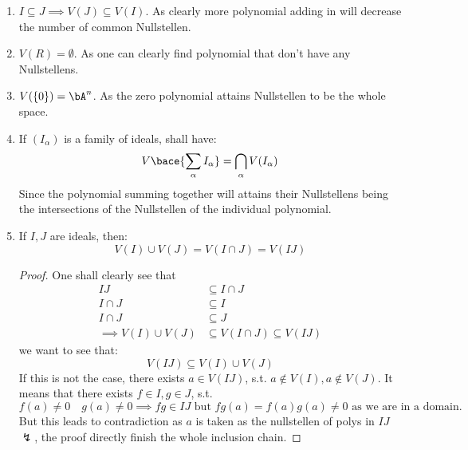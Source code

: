 \begin{remark}
	\leavevmode
	\begin{enumerate}
		\item \( I \subseteq J \implies V(J) \subseteq V(I) \). As clearly more polynomial adding in
		      will decrease the number of common Nullstellen.
		\item \( V(R) = \emptyset \). As one can clearly find polynomial that don't have any
		      Nullstellens.
		\item \( V(\{0\}) = \bA^n \). As the zero polynomial attains Nullstellen to be the whole space.
		\item If \( (I_\alpha) \) is a family of ideals, shall have:
		      \[
			      V\bace{\sum_{\alpha} I_\alpha} = \bigcap_\alpha V(I_\alpha)
		      \]
		      Since the polynomial summing together will attains their Nullstellens being the
		      intersections of the Nullstellen of the individual polynomial.
		\item If \( I, J \) are ideals, then:
		      \[
			      V(I) \cup V(J) = V(I \cap J) = V(IJ)
		      \]
		      \begin{proof}
			      One shall clearly see that
			      $$
				      \begin{aligned}
					      IJ                      & \subseteq I\cap J                     \\
					      I \cap J                & \subseteq I                           \\
					      I \cap J                & \subseteq J                           \\
					      \implies V(I) \cup V(J) & \subseteq V(I \cap J) \subseteq V(IJ)
				      \end{aligned}
			      $$
			      we want to see that:
			      \[
				      V(IJ) \subseteq V(I) \cup V(J)
			      \]
			      If this is not the case, there exists \( a\in V(IJ) \), s.t. \( a\not\in V(I), a\not\in
			      V(J)\). It means that there exists \( f \in I, g\in J \), s.t.
			      \[
				      f(a) \ne 0 \quad g(a) \ne 0 \implies fg \in IJ \text{ but } fg(a) = f(a) g(a) \ne 0
				      \text{ as we are in a domain.}
			      \]
			      But this leads to contradiction as \( a \) is taken as the nullstellen of polys in
			      \( IJ \) \( \lightning \), the proof directly finish the whole inclusion chain.
		      \end{proof}
	\end{enumerate}
\end{remark}

